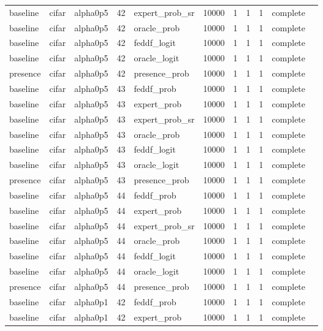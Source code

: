 \begin{tabular}{lllrlrrrrll}
baseline & cifar & alpha0p5 & 42 & expert\_prob\_sr & 10000 & 1 & 1 & 1 & complete &  \\
baseline & cifar & alpha0p5 & 42 & oracle\_prob & 10000 & 1 & 1 & 1 & complete &  \\
baseline & cifar & alpha0p5 & 42 & feddf\_logit & 10000 & 1 & 1 & 1 & complete &  \\
baseline & cifar & alpha0p5 & 42 & oracle\_logit & 10000 & 1 & 1 & 1 & complete &  \\
presence & cifar & alpha0p5 & 42 & presence\_prob & 10000 & 1 & 1 & 1 & complete &  \\
baseline & cifar & alpha0p5 & 43 & feddf\_prob & 10000 & 1 & 1 & 1 & complete &  \\
baseline & cifar & alpha0p5 & 43 & expert\_prob & 10000 & 1 & 1 & 1 & complete &  \\
baseline & cifar & alpha0p5 & 43 & expert\_prob\_sr & 10000 & 1 & 1 & 1 & complete &  \\
baseline & cifar & alpha0p5 & 43 & oracle\_prob & 10000 & 1 & 1 & 1 & complete &  \\
baseline & cifar & alpha0p5 & 43 & feddf\_logit & 10000 & 1 & 1 & 1 & complete &  \\
baseline & cifar & alpha0p5 & 43 & oracle\_logit & 10000 & 1 & 1 & 1 & complete &  \\
presence & cifar & alpha0p5 & 43 & presence\_prob & 10000 & 1 & 1 & 1 & complete &  \\
baseline & cifar & alpha0p5 & 44 & feddf\_prob & 10000 & 1 & 1 & 1 & complete &  \\
baseline & cifar & alpha0p5 & 44 & expert\_prob & 10000 & 1 & 1 & 1 & complete &  \\
baseline & cifar & alpha0p5 & 44 & expert\_prob\_sr & 10000 & 1 & 1 & 1 & complete &  \\
baseline & cifar & alpha0p5 & 44 & oracle\_prob & 10000 & 1 & 1 & 1 & complete &  \\
baseline & cifar & alpha0p5 & 44 & feddf\_logit & 10000 & 1 & 1 & 1 & complete &  \\
baseline & cifar & alpha0p5 & 44 & oracle\_logit & 10000 & 1 & 1 & 1 & complete &  \\
presence & cifar & alpha0p5 & 44 & presence\_prob & 10000 & 1 & 1 & 1 & complete &  \\
baseline & cifar & alpha0p1 & 42 & feddf\_prob & 10000 & 1 & 1 & 1 & complete &  \\
baseline & cifar & alpha0p1 & 42 & expert\_prob & 10000 & 1 & 1 & 1 & complete &  \\

\end{tabular}

